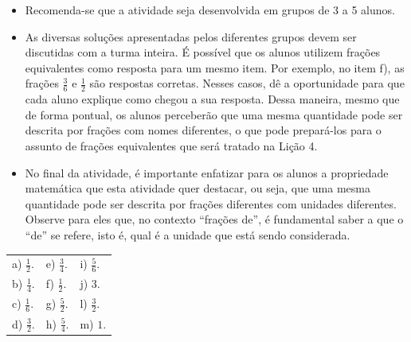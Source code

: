 \begin{multicols}{2}
\begin{orientacoes}
  \begin{itemize} %
    \item       Recomenda-se que a atividade seja desenvolvida em grupos de 3 a 5 alunos.
    \item       As diversas soluções apresentadas pelos diferentes grupos devem ser discutidas com a turma inteira. É possível que os alunos utilizem frações equivalentes como resposta para um mesmo item. Por exemplo, no item f), as frações       $\frac{3}{6}$ e       $\frac{1}{2}$ são respostas corretas. Nesses casos, dê a oportunidade para que cada aluno explique como chegou a sua resposta. Dessa maneira, mesmo que de forma pontual, os alunos perceberão que uma mesma quantidade pode ser descrita por frações com nomes diferentes, o que pode prepará-los para o assunto de frações equivalentes que será tratado na Lição 4.
    \item       No final da atividade, é importante enfatizar para os alunos a propriedade matemática que esta atividade quer destacar, ou seja, que uma mesma quantidade pode ser descrita por frações diferentes com unidades diferentes. Observe para eles que, no contexto ``frações de'', é fundamental saber a que o       ``de''     se refere, isto é, qual é a unidade que está sendo considerada.
\end{itemize} %


  \vspace{.1cm}


\end{orientacoes}

\newpage

\begin{solucao}{}{}  

\begin{tabular}{m{}m{}m{}}
    a) $\frac{1}{2}$. & e) $\frac{3}{4}$. &  i) $\frac{5}{6}$.\\
    b) $\frac{1}{4}$. & f) $\frac{1}{2}$. &  j) $3$.\\
    c) $\frac{1}{6}$. & g) $\frac{5}{2}$. &  l) $\frac{3}{2}$.\\
    d) $\frac{3}{2}$. & h) $\frac{5}{4}$. &  m) $1$.
\end{tabular} %


\end{solucao}
\end{multicols}
